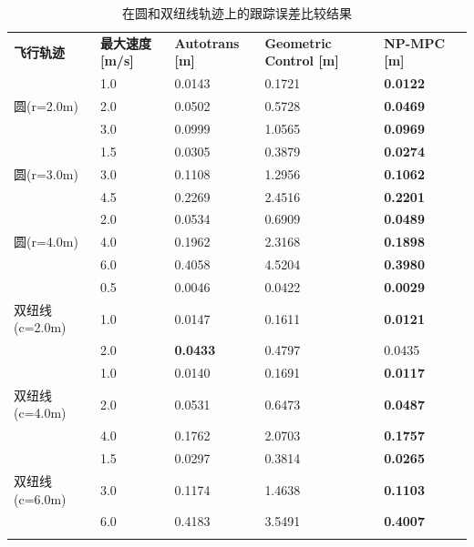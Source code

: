 \documentclass[lang=chs, degree=master, blindreview=true, winfonts=true]{yanputhesis}
\begin{document}
\begin{table}[!ht]
    \caption{在圆和双纽线轨迹上的跟踪误差比较结果}
    \label{Table10}
    \centering
    \renewcommand\arraystretch{1.5} %
    \begin{tabular}{m{3cm}<{\centering} m{2.5cm}<{\centering} m{2.5cm}<{\centering} m{2.5cm}<{\centering} m{2.5cm}<{\centering} m{2.5cm}<{\centering}}
        \Xhline{1.pt}
        \textbf{飞行轨迹} & \textbf{最大速度 [m/s]} & \textbf{Autotrans [m]} & \textbf{Geometric Control [m]} & \textbf{NP-MPC [m]} \\
        \Xhline{1.pt}
        ~  & 1.0 & 0.0143 & 0.1721 & \textbf{0.0122} \\ 
        圆(r=2.0m)  & 2.0 & 0.0502 & 0.5728 & \textbf{0.0469} \\ 
        ~  & 3.0 & 0.0999 & 1.0565 & \textbf{0.0969} \\ \hline    
    	~ & 1.5 & 0.0305 & 0.3879 & \textbf{0.0274} \\ 
        圆(r=3.0m)  & 3.0 & 0.1108 & 1.2956 & \textbf{0.1062} \\ 
        ~  & 4.5 & 0.2269 & 2.4516 & \textbf{0.2201} \\ \hline    
        ~  & 2.0 & 0.0534 & 0.6909 & \textbf{0.0489} \\ 
        圆(r=4.0m) & 4.0 & 0.1962 & 2.3168 & \textbf{0.1898} \\ 
        ~  & 6.0 & 0.4058 & 4.5204 & \textbf{0.3980} \\ \hline    
        ~  & 0.5 & 0.0046 & 0.0422 & \textbf{0.0029} \\ 
        双纽线 (c=2.0m)  & 1.0 & 0.0147 & 0.1611 & \textbf{0.0121} \\ 
        ~  & 2.0 & \textbf{0.0433} & 0.4797 & {0.0435} \\ \hline    
        ~  & 1.0 & 0.0140 & 0.1691 & \textbf{0.0117} \\ 
        双纽线 (c=4.0m)  & 2.0 & 0.0531 & 0.6473 & \textbf{0.0487} \\ 
        ~ &  4.0 & 0.1762 & 2.0703 & \textbf{0.1757} \\ \hline    
        ~ &  1.5 & 0.0297 & 0.3814 & \textbf{0.0265} \\ 
        双纽线 (c=6.0m) & 3.0 & 0.1174 & 1.4638 & \textbf{0.1103} \\ 
         ~ & 6.0 & 0.4183 & 3.5491 & \textbf{0.4007} \\ \hline        \Xhline{1.pt}
    \end{tabular}
\end{table}
\end{document}
